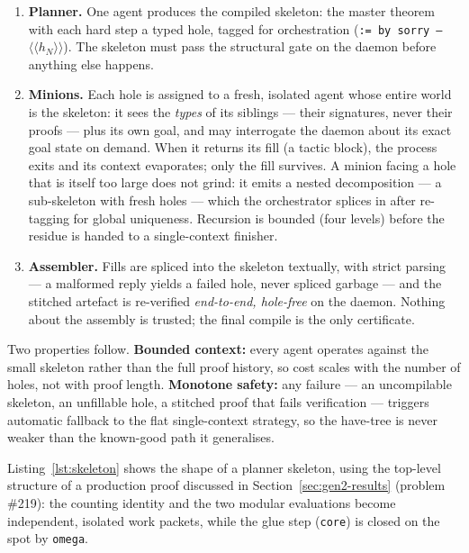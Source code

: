 \documentclass[12pt, a4paper]{article}
\begin{document}
\begin{enumerate}[leftmargin=*]
  \item \textbf{Planner.} One agent produces the compiled skeleton: the
    master theorem with each hard step a typed hole, tagged for orchestration
    (\texttt{:= by sorry --}$\langle\!\langle h_N \rangle\!\rangle$). The
    skeleton must pass the structural gate on the daemon before anything
    else happens.
  \item \textbf{Minions.} Each hole is assigned to a fresh, isolated agent
    whose entire world is the skeleton: it sees the \emph{types} of its
    siblings --- their signatures, never their proofs --- plus its own goal,
    and may interrogate the daemon about its exact goal state on demand.
    When it returns its fill (a tactic block), the process exits and its
    context evaporates; only the fill survives. A minion facing a hole that
    is itself too large does not grind: it emits a nested decomposition ---
    a sub-skeleton with fresh holes --- which the orchestrator splices in
    after re-tagging for global uniqueness. Recursion is bounded
    (four levels) before the residue is handed to a single-context finisher.
  \item \textbf{Assembler.} Fills are spliced into the skeleton textually,
    with strict parsing --- a malformed reply yields a failed hole, never
    spliced garbage --- and the stitched artefact is re-verified
    \emph{end-to-end, hole-free} on the daemon. Nothing about the assembly
    is trusted; the final compile is the only certificate.
\end{enumerate}

Two properties follow. \textbf{Bounded context:} every agent operates
against the small skeleton rather than the full proof history, so cost
scales with the number of holes, not with proof length. \textbf{Monotone
safety:} any failure --- an uncompilable skeleton, an unfillable hole, a
stitched proof that fails verification --- triggers automatic fallback to
the flat single-context strategy, so the have-tree is never weaker than the
known-good path it generalises.

Listing~\ref{lst:skeleton} shows the shape of a planner skeleton, using the
top-level structure of a production proof discussed in
Section~\ref{sec:gen2-results} (problem \#219): the counting identity and
the two modular evaluations become independent, isolated work packets, while
the glue step (\texttt{core}) is closed on the spot by \texttt{omega}.
\end{document}
